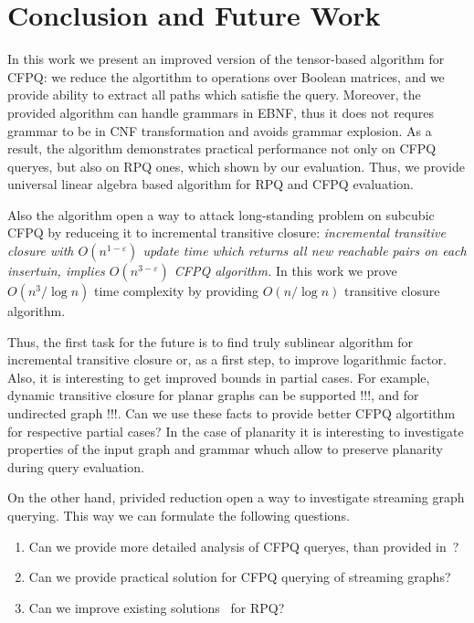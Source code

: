 \section{Conclusion and Future Work}

In this work we present an improved version of the tensor-based algorithm for CFPQ: we reduce the algortithm to operations over Boolean matrices, and we provide ability to extract all paths which satisfie the query.
Moreover, the provided algorithm can handle grammars in EBNF, thus it does not requres grammar to be in CNF transformation and avoids grammar explosion.
As a result, the algorithm demonstrates practical performance not only on CFPQ queryes, but also on RPQ ones, which shown by our evaluation. 
Thus, we provide universal linear algebra based algorithm for RPQ and CFPQ evaluation.

Also the algorithm open a way to attack long-standing problem on subcubic CFPQ by reduceing it to incremental transitive closure: \textit{incremental transitive closure with $O(n^{1-\varepsilon})$ update time which returns all new reachable pairs on each insertuin, implies $O(n^{3-\varepsilon})$ CFPQ algorithm.}
In this work we prove $O(n^3/\log{n})$ time complexity by providing $O(n/\log{n})$ transitive closure algorithm.

Thus, the first task for the future is to find truly sublinear algorithm for incremental transitive closure or, as a first step, to improve logarithmic factor.
Also, it is interesting to get improved bounds in partial cases.
For example, dynamic transitive closure for planar graphs can be supported !!!, and for undirected graph !!!. Can we use these facts to provide better CFPQ algortithm for respective partial cases? 
In the case of planarity it is interesting to investigate properties of the input graph and grammar whuch allow to preserve planarity during query evaluation.

On the other hand, privided reduction open a way to investigate streaming graph querying.
This way we can formulate the following questions.
\begin{enumerate}
\item Can we provide more detailed analysis of CFPQ queryes, than provided in~\cite{!!!}?
\item Can we provide practical solution for CFPQ querying of streaming graphs?
\item Can we improve existing solutions~\cite{Pacaci2020RegularPQ} for RPQ?
\end{enumerate}

